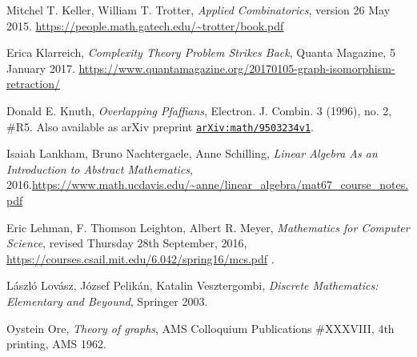 \documentclass[numbers=enddot,12pt,final,onecolumn,notitlepage]{scrartcl}%
\theoremstyle{definition}
\newcommand\arxiv[1]{\href{http://www.arxiv.org/abs/#1}{\texttt{arXiv:#1}}}
\begin{document}
\begin{thebibliography}{9999999999}

Mitchel T. Keller, William T. Trotter,
\textit{Applied Combinatorics},
version 26 May 2015.
\newline \url{https://people.math.gatech.edu/~trotter/book.pdf}

Erica Klarreich,
\textit{Complexity Theory Problem Strikes Back},
Quanta Magazine, 5 January 2017.
\newline \url{https://www.quantamagazine.org/20170105-graph-isomorphism-retraction/}

 Donald E. Knuth,
\textit{Overlapping Pfaffians},
Electron. J. Combin. 3 (1996), no. 2, \#R5.
Also available as arXiv preprint \arxiv{math/9503234v1}.


Isaiah Lankham, Bruno Nachtergaele, Anne
Schilling, \textit{Linear Algebra As an Introduction to Abstract Mathematics},
2016.\newline\url{https://www.math.ucdavis.edu/~anne/linear_algebra/mat67_course_notes.pdf}

Eric Lehman, F. Thomson Leighton, Albert R. Meyer,
\textit{Mathematics for Computer Science}, revised Thursday 28th September,
2016, \newline\url{https://courses.csail.mit.edu/6.042/spring16/mcs.pdf} .

L\'aszl\'o Lov\'asz, J\'ozsef Pelik\'an,
Katalin Vesztergombi,
\textit{Discrete Mathematics: Elementary and Beyound},
Springer 2003.


Oystein Ore, \textit{Theory of graphs},
AMS Colloquium Publications \#XXXVIII,
4th printing, AMS 1962.


\end{thebibliography}
\end{document}
